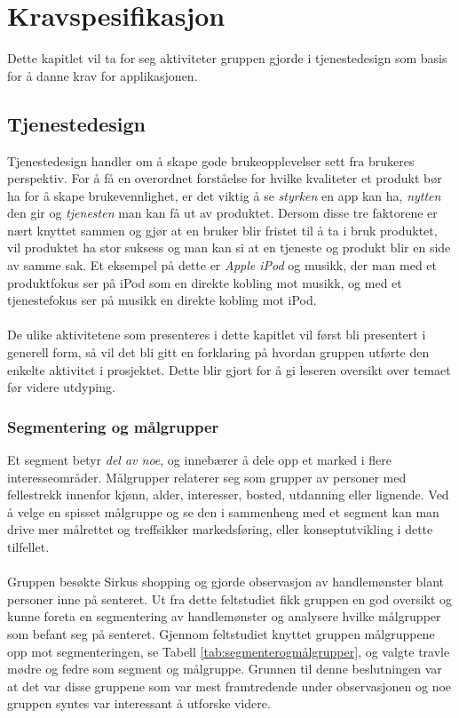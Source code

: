 \section{\textcolor[HTML]{D32F2F}{Kravspesifikasjon}}
\label{kravspesifikasjon}

Dette kapitlet vil ta for seg aktiviteter gruppen gjorde i tjenestedesign som basis for å danne krav for applikasjonen.

\subsection{Tjenestedesign}
\label{tjenestedesign}
Tjenestedesign handler om å skape gode brukeopplevelser sett fra brukeres perspektiv. For å få en overordnet forståelse for hvilke kvaliteter et produkt bør ha for å skape brukevennlighet, er det viktig å se \textit{styrken} en app kan ha, \textit{nytten} den gir og \textit{tjenesten} man kan få ut av produktet. Dersom disse tre faktorene er nært knyttet sammen og gjør at en bruker blir fristet til å ta i bruk produktet, vil produktet ha stor suksess og man kan si at en tjeneste og produkt blir en side av samme sak. Et eksempel på dette er \textit{Apple iPod} og musikk, der man med et produktfokus ser på iPod som en direkte kobling mot musikk, og med et tjenestefokus ser på musikk en direkte kobling mot iPod\cite{servicedesign}.
\\\\
De ulike aktivitetene som presenteres i dette kapitlet vil først bli presentert i generell form, så vil det bli gitt en forklaring på hvordan gruppen utførte den enkelte aktivitet i prosjektet. Dette blir gjort for å gi leseren oversikt over temaet før videre utdyping. 

\subsubsection{Segmentering og målgrupper}
Et segment betyr \textit{del av noe}, og innebærer å dele opp et marked i flere interesseområder. Målgrupper relaterer seg som grupper av personer med fellestrekk innenfor kjønn, alder, interesser, bosted, utdanning eller lignende\cite{malgruppe}. Ved å velge en spisset målgruppe og se den i sammenheng med et segment kan man drive mer målrettet og treffsikker markedsføring, eller konseptutvikling i dette tilfellet\cite{malgruppe2}.
\\\\
Gruppen besøkte Sirkus shopping og gjorde observasjon av handlemønster blant personer inne på senteret. Ut fra dette feltstudiet fikk gruppen en god oversikt og kunne foreta en segmentering av handlemønster og analysere hvilke målgrupper som befant seg på senteret. 
Gjennom feltstudiet knyttet gruppen målgruppene opp mot segmenteringen, se Tabell \ref{tab:segmenterogmålgrupper}, og valgte travle mødre og fedre som segment og målgruppe. Grunnen til denne beslutningen var at det var disse gruppene som var mest framtredende under observasjonen og noe gruppen syntes var interessant å utforske videre.

